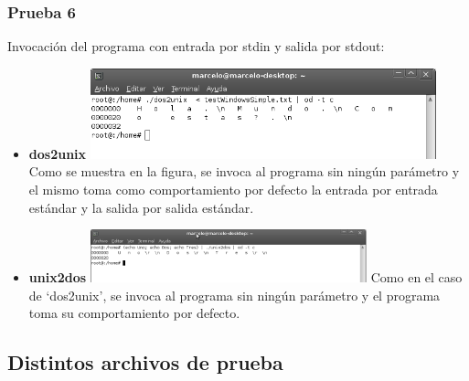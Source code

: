 \documentclass[a4paper,10pt]{article}
\begin{document}
    \subsubsection{Prueba 6}
    Invocaci\'on del programa con entrada por stdin y salida por stdout:
      \begin{itemize}
      \item \textbf{dos2unix}
      \newline
      \includegraphics[width=10cm, viewport=0 0 661 173]{../Informe/Imagenes/prueba6-invocacion-dos2unix.png}
      \newline
      Como se muestra en la figura, se invoca al programa sin ning\'un par\'ametro y el mismo toma como comportamiento por defecto
      la entrada por entrada est\'andar y la salida por salida est\'andar.
      \item \textbf{unix2dos}
      \newline
      \includegraphics[width=8cm, viewport=0 0 904 174]{../Informe/Imagenes/prueba6-invocacion-unix2dos.png}	      
      \newline
      Como en el caso de `dos2unix', se invoca al programa sin ning\'un par\'ametro y el programa toma su comportamiento
      por defecto.
      
      \end{itemize}

  \subsection{Distintos archivos de prueba}
\end{document}
